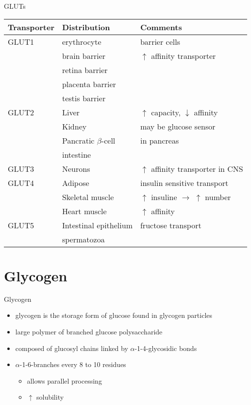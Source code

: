 \documentclass[presentation, smaller]{beamer}
\begin{document}
\begin{frame}[label={sec:org98909d7}]{GLUTs}
\begin{center}
\begin{tabular}{lll}
Transporter & Distribution & Comments\\
\hline
GLUT1 & erythrocyte & barrier cells\\
 & brain barrier & \(\uparrow\) affinity transporter\\
 & retina barrier & \\
 & placenta barrier & \\
 & testis barrier & \\
\hline
GLUT2 & Liver & \(\uparrow\) capacity, \(\downarrow\) affinity\\
 & Kidney & may be glucose sensor\\
 & Pancratic \(\beta\)-cell & in pancreas\\
 & intestine & \\
\hline
GLUT3 & Neurons & \(\uparrow\) affinity  transporter in CNS\\
\hline
GLUT4 & Adipose & insulin sensitive transport\\
 & Skeletal muscle & \(\uparrow\) insuline \(\to\) \(\uparrow\) number\\
 & Heart muscle & \(\uparrow\) affinity\\
\hline
GLUT5 & Intestinal epithelium & fructose transport\\
 & spermatozoa & \\
\end{tabular}
\end{center}
\end{frame}

\section{Glycogen}
\label{sec:org5abe1e0}
\begin{frame}[label={sec:org56e6eb7}]{Glycogen}
\begin{itemize}
\item glycogen is the storage form of glucose found in glycogen particles
\item large polymer of branched glucose polysaccharide
\item composed of glucosyl chains linked by \(\alpha\)-1-4-glycosidic bonds
\item \(\alpha\)-1-6-branches every 8 to 10 residues
\begin{itemize}
\item allows parallel processing
\item \(\uparrow\) solubility
\end{itemize}
\end{itemize}
\end{frame}
\end{document}
